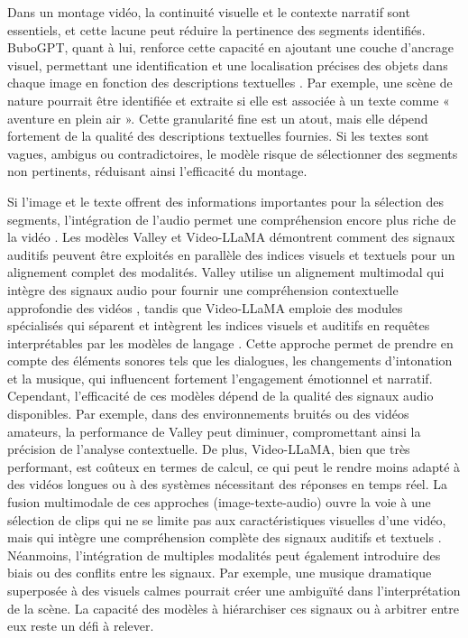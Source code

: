 Dans un montage vidéo, la continuité visuelle et le contexte narratif sont essentiels, et cette lacune peut réduire la pertinence des segments identifiés. BuboGPT, quant à lui, renforce cette capacité en ajoutant une couche d’ancrage visuel, permettant une identification et une localisation précises des objets dans chaque image en fonction des descriptions textuelles \cite{feng2023}\cite{munasinghe2023_pgvideo}. Par exemple, une scène de nature pourrait être identifiée et extraite si elle est associée à un texte comme « aventure en plein air ». Cette granularité fine est un atout, mais elle dépend fortement de la qualité des descriptions textuelles fournies. Si les textes sont vagues, ambigus ou contradictoires, le modèle risque de sélectionner des segments non pertinents, réduisant ainsi l’efficacité du montage. 

Si l’image et le texte offrent des informations importantes pour la sélection des segments, l’intégration de l’audio permet une compréhension encore plus riche de la vidéo \cite{anonymous2023_videollama}\cite{han2024_clip}. Les modèles Valley \cite{anonymous2023_valley} et Video-LLaMA \cite{anonymous2023_videollama} démontrent comment des signaux auditifs peuvent être exploités en parallèle des indices visuels et textuels pour un alignement complet des modalités. Valley utilise un alignement multimodal qui intègre des signaux audio pour fournir une compréhension contextuelle approfondie des vidéos \cite{huang2024_vtimellm}\cite{anonymous2023_valley}, tandis que Video-LLaMA emploie des modules spécialisés qui séparent et intègrent les indices visuels et auditifs en requêtes interprétables par les modèles de langage \cite{xu2024}\cite{anonymous2023_valley}. Cette approche permet de prendre en compte des éléments sonores tels que les dialogues, les changements d’intonation et la musique, qui influencent fortement l’engagement émotionnel et narratif. Cependant, l’efficacité de ces modèles dépend de la qualité des signaux audio disponibles. Par exemple, dans des environnements bruités ou des vidéos amateurs, la performance de Valley peut diminuer, compromettant ainsi la précision de l’analyse contextuelle. De plus, Video-LLaMA, bien que très performant, est coûteux en termes de calcul, ce qui peut le rendre moins adapté à des vidéos longues ou à des systèmes nécessitant des réponses en temps réel. La fusion multimodale de ces approches (image-texte-audio) ouvre la voie à une sélection de clips qui ne se limite pas aux caractéristiques visuelles d’une vidéo, mais qui intègre une compréhension complète des signaux auditifs et textuels \cite{wang2024_hawkeye}\cite{anonymous2017_localizing}. Néanmoins, l’intégration de multiples modalités peut également introduire des biais ou des conflits entre les signaux. Par exemple, une musique dramatique superposée à des visuels calmes pourrait créer une ambiguïté dans l’interprétation de la scène. La capacité des modèles à hiérarchiser ces signaux ou à arbitrer entre eux reste un défi à relever.

